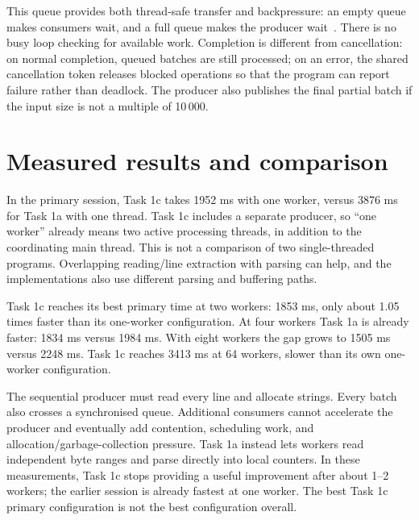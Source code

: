 

This queue provides both thread-safe transfer and backpressure: an empty queue makes consumers wait, and a full queue makes the producer wait~\cite{blocking}. There is no busy loop checking for available work. Completion is different from cancellation: on normal completion, queued batches are still processed; on an error, the shared cancellation token releases blocked operations so that the program can report failure rather than deadlock. The producer also publishes the final partial batch if the input size is not a multiple of 10\,000.


\section{Measured results and comparison}


In the primary session, Task 1c takes 1952 ms with one worker, versus 3876 ms for Task 1a with one thread. Task 1c includes a separate producer, so ``one worker'' already means two active processing threads, in addition to the coordinating main thread. This is not a comparison of two single-threaded programs. Overlapping reading/line extraction with parsing can help, and the implementations also use different parsing and buffering paths.

Task 1c reaches its best primary time at two workers: 1853 ms, only about 1.05 times faster than its one-worker configuration. At four workers Task 1a is already faster: 1834 ms versus 1984 ms. With eight workers the gap grows to 1505 ms versus 2248 ms. Task 1c reaches 3413 ms at 64 workers, slower than its own one-worker configuration.

The sequential producer must read every line and allocate strings. Every batch also crosses a synchronised queue. Additional consumers cannot accelerate the producer and eventually add contention, scheduling work, and allocation/garbage-collection pressure. Task 1a instead lets workers read independent byte ranges and parse directly into local counters. In these measurements, Task 1c stops providing a useful improvement after about 1--2 workers; the earlier session is already fastest at one worker. The best Task 1c primary configuration is not the best configuration overall.

